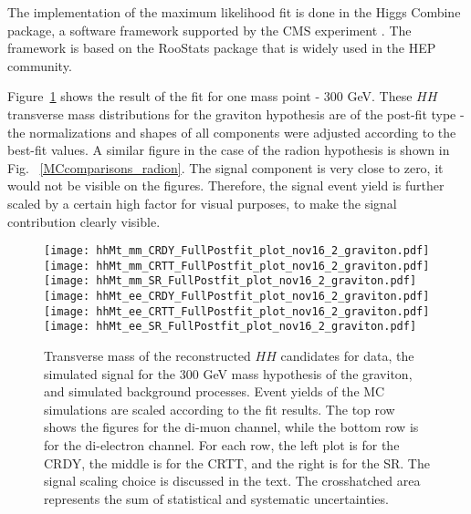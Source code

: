 The implementation of the maximum likelihood fit is done in the Higgs Combine package, a software framework supported by the CMS experiment \cite{HiggsCombine,CMS-NOTE-2011-005}. The framework is based on the RooStats package \cite{RooStats} that is widely used in the HEP community. 


Figure~\ref{MCcomparisons} shows the result of the fit for one mass point - 300 GeV. These $HH$ transverse mass distributions for the graviton hypothesis are of the post-fit type - the normalizations and shapes of all components were adjusted according to the best-fit values. A similar figure in the case of the radion hypothesis is shown in Fig. ~\ref{MCcomparisons_radion}. The signal component is very close to zero, it would not be visible on the figures. Therefore, the signal event yield is further scaled by a certain high factor for visual purposes, to make the signal contribution clearly visible. 

\begin{figure}[H]
\begin{center}
\texttt{[image: hhMt\_mm\_CRDY\_FullPostfit\_plot\_nov16\_2\_graviton.pdf]}
\texttt{[image: hhMt\_mm\_CRTT\_FullPostfit\_plot\_nov16\_2\_graviton.pdf]}
\texttt{[image: hhMt\_mm\_SR\_FullPostfit\_plot\_nov16\_2\_graviton.pdf]} \\
\texttt{[image: hhMt\_ee\_CRDY\_FullPostfit\_plot\_nov16\_2\_graviton.pdf]}
\texttt{[image: hhMt\_ee\_CRTT\_FullPostfit\_plot\_nov16\_2\_graviton.pdf]}
\texttt{[image: hhMt\_ee\_SR\_FullPostfit\_plot\_nov16\_2\_graviton.pdf]}
\caption[Transverse mass of the reconstructed $HH$ candidates for graviton hypothesis.]{Transverse mass of the reconstructed $HH$ candidates for data, the simulated signal for the 300 GeV mass hypothesis of the graviton, and simulated background processes. Event yields of the MC simulations are scaled according to the fit results. The top row shows the figures for the di-muon channel, while the bottom row is for the di-electron channel. For each row, the left plot is for the CRDY, the middle is for the CRTT, and the right is for the SR. The signal scaling choice is discussed in the text. The crosshatched area represents the sum of statistical and systematic uncertainties.
\label{MCcomparisons} } 
\end{center}
\end{figure}

